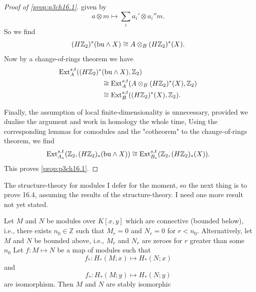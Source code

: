 \documentclass[../main]{subfiles}
\begin{document}
\begin{proof}[Proof of \ref{prop:p3ch16.1}]
given by \begin{equation*}
    a \otimes m \mapsto \sum_{i}a_{i}'\otimes a_{i}''m.
\end{equation*}
So we find \begin{equation*}
    (H\mathbb{Z}_2)^{\ast}(\mathrm{bu} \wedge X) \cong A \otimes_{B}(H\mathbb{Z}_2)^{\ast}(X).
\end{equation*}
Now by a change-of-rings theorem we have 
\begin{align*}
    \mathrm{Ext}_{A}^{s, t}((H\mathbb{Z}_2)^{\ast}&(\mathrm{bu} \wedge X), \mathbb{Z}_2)\\
    &\cong\mathrm{Ext}_{A}^{s, t}(A \otimes_{B}(H\mathbb{Z}_2)^{\ast}(X), \mathbb{Z}_2)\\
    &\cong \mathrm{Ext}_B^{s,t}((H\mathbb{Z}_2)^\ast(X),\mathbb{Z}_2).
\end{align*}

Finally, the assumption of local finite-dimensionality is unnecessary, 
provided we dualise the argument and work in homology the whole time, 
Using the corresponding lemmas for comodules and the "cotheorem" to
the change-of-rings theorem, we find \begin{equation*}
    \mathrm{Ext}_{A_\ast}^{s,t}(\mathbb{Z}_2,(H\mathbb{Z}_2)_\ast(\mathrm{bu}\wedge X))\cong\mathrm{Ext}_{B_\ast}^{s,t}(\mathbb{Z}_2,(H\mathbb{Z}_2)_\ast(X)).
\end{equation*}
This proves \ref{prop:p3ch16.1}.
     \end{proof}
     
    The structure-theory for modules I defer for the moment, so the
next thing is to prove 16.4, assuming the results of the structure-theory.
I need one more result not yet stated. 

\begin{lemma} \label{lem:p3ch16.7}
 Let $M$ and $N$ be modules over $K[x, y]$ which are connective (bounded below), i.e., there exists $n_{0} \in \mathbb{Z}$ such that $M_{r}=0$ and $N_{r}=0$ for $r<n_{0}$. Alternatively, let $M$ and $N$ be bounded above, i.e., $M_{r}$ and $N_{r}$ are zeroes for $r$ greater than some $n_{0}$ Let $f:M\mapsto N$ be a map of modules such that \begin{equation*}
     f_{\ast}:H_{\ast}(M;x)\mapsto H_{\ast}(N;x) 
 \end{equation*}
 and \begin{equation*}
      f_{\ast}:H_{\ast}(M;y)\mapsto H_{\ast}(N;y) 
 \end{equation*}
 are isomorphism. Then $M$ and $N$ are stably isomorphic
\end{lemma}
\end{document}
